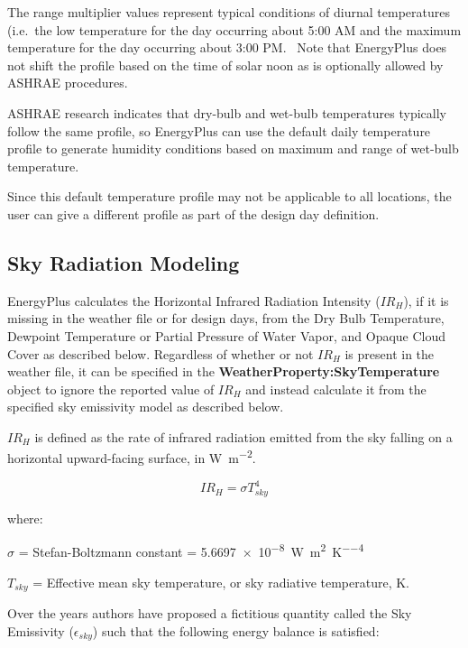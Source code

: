 The range multiplier values represent typical conditions of diurnal temperatures (i.e.~the low temperature for the day occurring about 5:00 AM and the maximum temperature for the day occurring about 3:00 PM.~ Note that EnergyPlus does not shift the profile based on the time of solar noon as is optionally allowed by ASHRAE procedures.

ASHRAE research indicates that dry-bulb and wet-bulb temperatures typically follow the same profile, so EnergyPlus can use the default daily temperature profile to generate humidity conditions based on maximum and range of wet-bulb temperature.

Since this default temperature profile may not be applicable to all locations, the user can give a different profile as part of the design day definition.

\subsection{Sky Radiation Modeling}\label{sky-radiation-modeling}

EnergyPlus calculates the Horizontal Infrared Radiation Intensity ($IR_H$), if it is missing in the weather file or for design days, from the Dry Bulb Temperature, Dewpoint Temperature or Partial Pressure of Water Vapor, and Opaque Cloud Cover as described below. Regardless of whether or not $IR_H$ is present in the weather file, it can be specified in the \textbf{WeatherProperty:SkyTemperature} object to ignore the reported value of $IR_H$ and instead calculate it from the specified sky emissivity model as described below.

$IR_H$ is defined as the rate of infrared radiation emitted from the sky falling on a horizontal upward-facing surface, in \si{\watt\per\m\squared}.

\begin{equation}
IR_H = \sigma T_{sky}^4
\end{equation}

\noindent where:
\newline

$\sigma$ = Stefan-Boltzmann constant = \SI{5.6697e-8}{\watt\per\meter\squared\per\kelvin\tothe{4}}

$T_{sky}$ = Effective mean sky temperature, or sky radiative temperature, \si{\kelvin}.
\newline

Over the years authors have proposed a fictitious quantity called the Sky Emissivity ($\epsilon_{sky}$) such that the following energy balance is satisfied:

